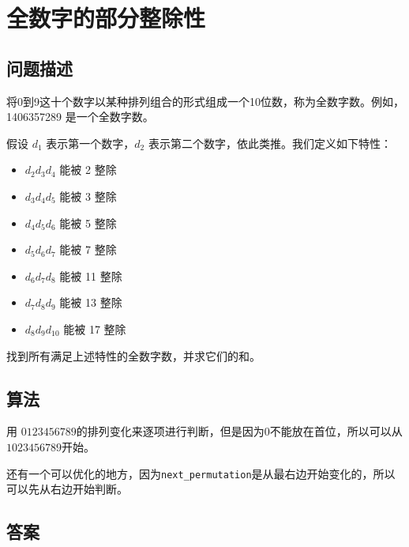 \section{全数字的部分整除性}
\subsection{问题描述}
\begin{tcolorbox}
将0到9这十个数字以某种排列组合的形式组成一个10位数，称为全数字数。例如，1406357289 是一个全数字数。

假设 \( d_1 \) 表示第一个数字，\( d_2 \) 表示第二个数字，依此类推。我们定义如下特性：

\begin{itemize}
	\item \( d_2d_3d_4 \) 能被 2 整除
	\item \( d_3d_4d_5 \) 能被 3 整除
	\item \( d_4d_5d_6 \) 能被 5 整除
	\item \( d_5d_6d_7 \) 能被 7 整除
	\item \( d_6d_7d_8 \) 能被 11 整除
	\item \( d_7d_8d_9 \) 能被 13 整除
	\item \( d_8d_9d_{10} \) 能被 17 整除
\end{itemize}

找到所有满足上述特性的全数字数，并求它们的和。

\end{tcolorbox}

\subsection{算法}
用 \( 0123456789 \)的排列变化来逐项进行判断，但是因为0不能放在首位，所以可以从 \( 1023456789 \)开始。

还有一个可以优化的地方，因为\texttt{next\_permutation}是从最右边开始变化的，所以可以先从右边开始判断。

\subsection{答案}
